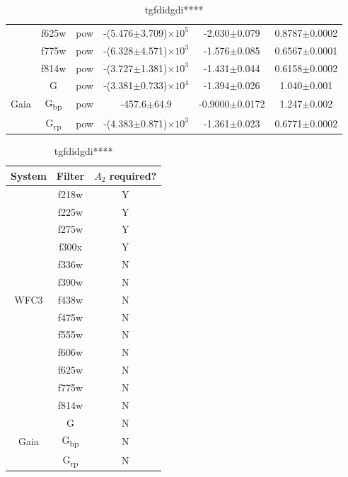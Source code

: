 \documentclass[12pt, a4paper]{report}
\begin{document}
\begin{table}
\begin{tabular}{cccccc}
& f625w & pow & -(5.476$\pm$3.709)$\times 10^{5}$ & -2.030$\pm$0.079 & 0.8787$\pm$0.0002 \\
& f775w & pow & -(6.328$\pm$4.571)$\times 10^{3}$ & -1.576$\pm$0.085 & 0.6567$\pm$0.0001 \\
& f814w & pow & -(3.727$\pm$1.381)$\times 10^{3}$ & -1.431$\pm$0.044 & 0.6158$\pm$0.0002 \\ \hline
& G & pow & -(3.381$\pm$0.733)$\times 10^{4}$ & -1.394$\pm$0.026 & 1.040$\pm$0.001 \\
Gaia & G\textsubscript{bp} & pow & -457.6$\pm$64.9 & -0.9000$\pm$0.0172 & 1.247$\pm$0.002 \\
& G\textsubscript{rp} & pow & -(4.383$\pm$0.871)$\times 10^{3}$ & -1.361$\pm$0.023 & 0.6771$\pm$0.0002 \\ \hline

\end{tabular}
\caption{tgfdidgdi****}
\label{R1_coeffs_table}
\end{table}

\begin{table}
\begin{tabular}{ccc}
\hline
System & Filter & $A_{2}$ required? \\
\hline
& f218w & Y \\
& f225w & Y \\
& f275w & Y \\
& f300x & Y \\
& f336w & N \\
& f390w & N \\
WFC3 & f438w & N \\
& f475w & N \\
& f555w & N \\
& f606w & N \\
& f625w & N \\
& f775w & N \\
& f814w & N \\
\hline
& G & N \\
Gaia & G\textsubscript{bp} & N \\
& G\textsubscript{rp} & N \\ \hline

\end{tabular}
\caption{tgfdidgdi****}
\label{R2_yn_table}
\end{table}
\end{document}
